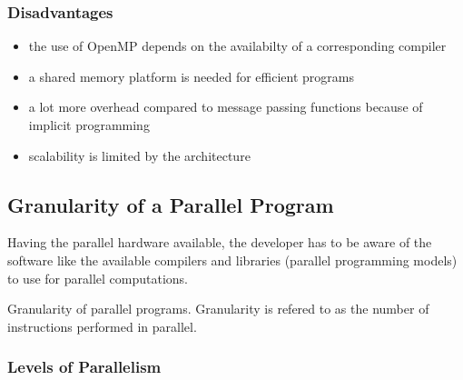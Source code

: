 \subsubsection{Disadvantages}

\begin{itemize}
\item the use of OpenMP depends on the availabilty of a corresponding
  compiler
\item a shared memory platform is needed for efficient programs
\item a lot more overhead compared to message passing functions because
  of implicit programming
\item scalability is limited by the architecture
\end{itemize}

\subsection{Granularity of a Parallel Program}

Having the parallel hardware available, the developer has to be aware
of the software like the available compilers and
libraries (parallel programming models) to use for parallel
computations.

Granularity of parallel programs. Granularity is refered to as the
number of instructions performed in parallel. 
\subsubsection{Levels of Parallelism}

